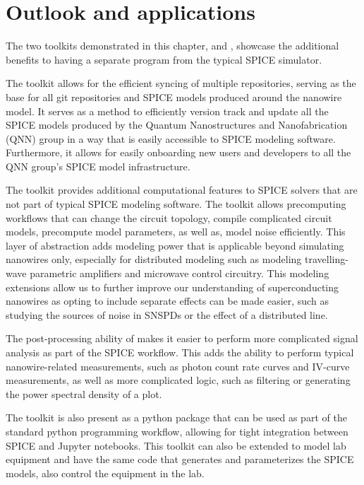 
\section{Outlook and applications}

The two toolkits demonstrated in this chapter,  and , showcase
the additional benefits to having a separate program from the typical SPICE simulator.

The  toolkit allows for the efficient syncing of multiple repositories, serving as the
base for all git repositories and SPICE models produced around the nanowire model.
It serves as a method to efficiently version track and update all the SPICE models produced by 
the Quantum Nanostructures and Nanofabrication (QNN) group in a way that is easily accessible
to SPICE modeling software.
Furthermore, it allows for easily onboarding new users and developers to all the QNN 
group's SPICE model infrastructure.

The  toolkit provides additional computational features to SPICE solvers
that are not part of typical SPICE modeling software. The toolkit allows precomputing 
workflows that can change the circuit topology, compile complicated circuit models,
precompute model parameters, as well as, model noise efficiently. This layer of abstraction
adds modeling power that is applicable beyond simulating nanowires only, especially for
distributed modeling such as modeling travelling-wave parametric amplifiers and microwave
control circuitry. This modeling extensions allow us to further improve our understanding
of superconducting nanowires as opting to include separate effects can be made easier,
such as studying the sources of noise in SNSPDs or the effect of a distributed line.

The post-processing ability of  makes it easier to perform more complicated
signal analysis as part of the SPICE workflow. This adds the ability to perform typical
nanowire-related measurements, such as photon count rate curves and IV-curve measurements,
as well as more complicated logic, such as filtering or generating the power spectral density
of a plot.

The  toolkit is also present as a python package that can be 
used as part of the standard python programming workflow, allowing for tight integration
between SPICE and Jupyter notebooks.
This toolkit can also be extended to model lab
equipment and have the same code that generates and parameterizes the SPICE models, also
control the equipment in the lab.